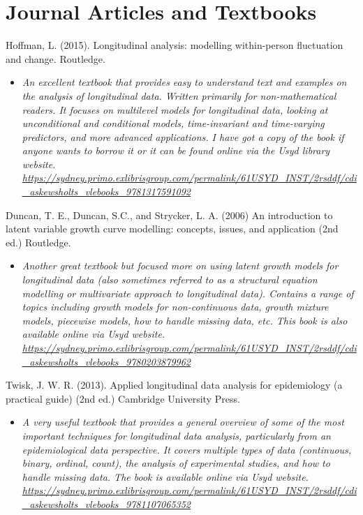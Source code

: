 \documentclass[
]{book}
\providecommand{\tightlist}{%
  \setlength{\itemsep}{0pt}\setlength{\parskip}{0pt}}
\begin{document}
\section{Journal Articles and Textbooks}\label{journal-articles-and-textbooks-2}

Hoffman, L. (2015). Longitudinal analysis: modelling within-person fluctuation and change. Routledge.

\begin{itemize}
\tightlist
\item
  \emph{An excellent textbook that provides easy to understand text and examples on the analysis of longitudinal data. Written primarily for non-mathematical readers. It focuses on multilevel models for longitudinal data, looking at unconditional and conditional models, time-invariant and time-varying predictors, and more advanced applications. I have got a copy of the book if anyone wants to borrow it or it can be found online via the Usyd library website. \url{https://sydney.primo.exlibrisgroup.com/permalink/61USYD_INST/2rsddf/cdi_askewsholts_vlebooks_9781317591092} }
\end{itemize}

Duncan, T. E., Duncan, S.C., and Strycker, L. A. (2006) An introduction to latent variable growth curve modelling: concepts, issues, and application (2nd ed.) Routledge.

\begin{itemize}
\tightlist
\item
  \emph{Another great textbook but focused more on using latent growth models for longitudinal data (also sometimes referred to as a structural equation modelling or multivariate approach to longitudinal data). Contains a range of topics including growth models for non-continuous data, growth mixture models, piecewise models, how to handle missing data, etc. This book is also available online via Usyd website. \url{https://sydney.primo.exlibrisgroup.com/permalink/61USYD_INST/2rsddf/cdi_askewsholts_vlebooks_9780203879962} }
\end{itemize}

Twisk, J. W. R. (2013). Applied longitudinal data analysis for epidemiology (a practical guide) (2nd ed.) Cambridge University Press.

\begin{itemize}
\tightlist
\item
  \emph{A very useful textbook that provides a general overview of some of the most important techniques for longitudinal data analysis, particularly from an epidemiological data perspective. It covers multiple types of data (continuous, binary, ordinal, count), the analysis of experimental studies, and how to handle missing data. The book is available online via Usyd website. \url{https://sydney.primo.exlibrisgroup.com/permalink/61USYD_INST/2rsddf/cdi_askewsholts_vlebooks_9781107065352} }
\end{itemize}
\end{document}

